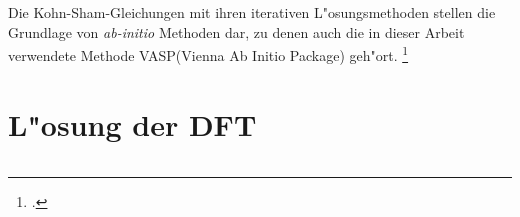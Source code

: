 Die Kohn-Sham-Gleichungen mit ihren iterativen L"osungsmethoden stellen die Grundlage von \textit{ab-initio} Methoden dar, zu denen auch die in dieser Arbeit verwendete Methode VASP(Vienna Ab Initio Package) geh"ort. \footcite[161]{fk2}




\section{L"osung der DFT}
\label{subsection:2.2.3}









\begin{equation}
	
	\label{eq:}
\end{equation}

